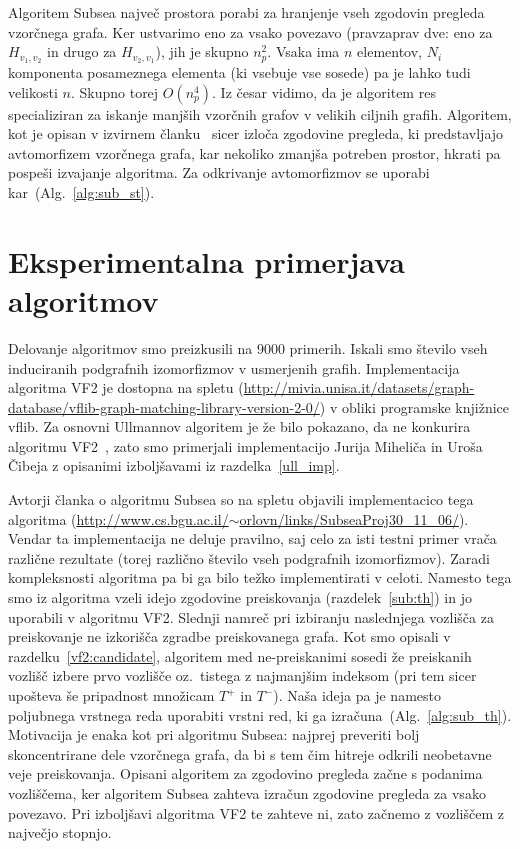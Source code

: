 \documentclass[a4paper, 12pt, ]{book}
\newcommand{\refalg}[1]{(Alg.~\ref{#1})}
\begin{document}
	Algoritem Subsea največ prostora porabi za hranjenje vseh zgodovin pregleda vzorčnega grafa. Ker ustvarimo eno za vsako povezavo (pravzaprav dve:
	eno za $H_{v_1, v_2}$ in drugo za $H_{v_2, v_1}$), jih je skupno $n_p^2$. Vsaka ima $n$ elementov, $N_i$ komponenta posameznega elementa (ki
	vsebuje vse sosede) pa je lahko tudi velikosti $n$. Skupno torej $O(n_p^4)$. Iz česar vidimo, da je algoritem res specializiran za iskanje manjših 
	vzorčnih grafov v velikih ciljnih grafih. Algoritem, kot je opisan v izvirnem članku~\cite{subsea} sicer izloča zgodovine pregleda, ki predstavljajo
	avtomorfizem vzorčnega grafa, kar nekoliko zmanjša potreben prostor, hkrati pa pospeši izvajanje algoritma. Za odkrivanje avtomorfizmov se uporabi 
	kar~\refalg{alg:sub_st}.




\chapter{Eksperimentalna primerjava algoritmov}

	Delovanje algoritmov smo preizkusili na 9000 primerih. Iskali smo število vseh induciranih podgrafnih izomorfizmov v usmerjenih grafih. Implementacija
	algoritma VF2 je dostopna na spletu (\href{http://mivia.unisa.it/datasets/graph-database/vflib-graph-matching-library-version-2-0/}
	{http://mivia.unisa.it/datasets/graph-database/{\allowbreak}vflib-graph-matching-library-version-2-0/}) v obliki programske knjižnice vflib. Za osnovni
	Ullmannov algoritem je že bilo
	pokazano, da ne konkurira algoritmu VF2~\cite{vf2_2}, zato smo primerjali implementacijo Jurija Miheliča in Uroša Čibeja z opisanimi izboljšavami
	iz razdelka~\ref{ull_imp}.

	Avtorji članka o algoritmu Subsea so na spletu objavili implementacico tega algoritma 
	(\href{http://www.cs.bgu.ac.il/~orlovn/links/SubseaProj30\_11\_06/}{http://www.cs.bgu.ac.il/$\sim$orlovn/links/SubseaProj30\_11\_06/}). Vendar ta
	implementacija ne deluje pravilno, saj celo za isti testni primer vrača različne rezultate (torej različno število vseh podgrafnih izomorfizmov). Zaradi
	kom\-pleksnosti algoritma pa bi ga bilo težko implementirati v celoti. Namesto tega smo iz algoritma vzeli idejo zgodovine preiskovanja 
	(razdelek~\ref{sub:th}) in jo uporabili
	v algoritmu VF2. Slednji namreč pri izbiranju naslednjega vozlišča za preiskovanje ne izkorišča zgradbe preiskovanega grafa. Kot smo opisali v 
	razdelku~\ref{vf2:candidate}, algoritem med ne-preiskanimi sosedi že preiskanih vozlišč izbere prvo vozlišče oz.~tistega z najmanjšim indeksom (pri tem 
	sicer upošteva še pripadnost množicam $T^+$ in $T^-$). Naša ideja pa je namesto poljubnega vrstnega reda uporabiti vrstni red, ki ga 
	izračuna~\refalg{alg:sub_th}. Motivacija je enaka kot pri algoritmu Subsea: najprej preveriti bolj skoncentrirane dele vzorčnega grafa, da bi s tem čim
	hitreje odkrili neobetavne veje preiskovanja. Opisani algoritem za zgodovino pregleda začne s podanima vozliščema, ker algoritem Subsea zahteva 
	izračun zgodovine pregleda za vsako povezavo. Pri izboljšavi algoritma VF2 te zahteve ni, zato začnemo z vozliščem z največjo stopnjo.
	
\end{document}
